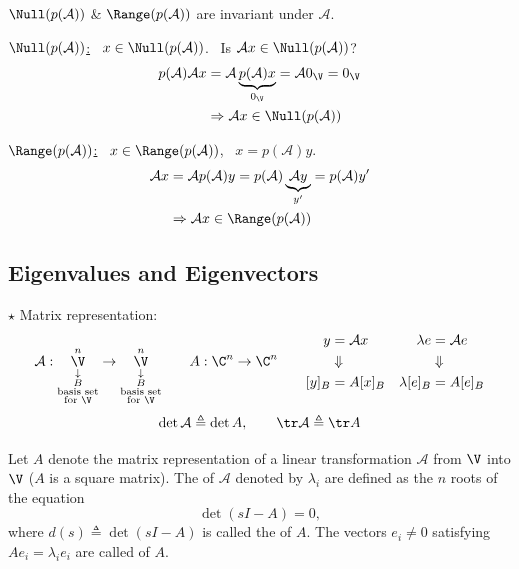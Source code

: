 \begin{example}
$\Null(p(\mathcal{A}))$ \& $\Range(p(\mathcal{A}))$ are invariant under $\mathcal{A}$.

\underline{$\Null(p(\mathcal{A}))$:} \ $x\in\Null(p(\mathcal{A}))$. \ Is $\mathcal{A}x\in\Null(p(\mathcal{A}))$?
\begin{align*}
p(\mathcal{A})\mathcal{A}x&=\mathcal{A}\underbrace{p(\mathcal{A})x}_{0_{\V}}=\mathcal{A}0_{\V}=0_{\V}\\
&\Rightarrow\mathcal{A}x\in\Null(p(\mathcal{A}))
\end{align*}

%
\underline{$\Range(p(\mathcal{A}))$:} \ $x\in\Range(p(\mathcal{A}))$, \ $x=p(\mathcal{A})y$.
\begin{align*}
\mathcal{A}x&=\mathcal{A}p(\mathcal{A})y=p(\mathcal{A})\underbrace{\mathcal{A}y}_{y'}=p(\mathcal{A})y'\\
&\Rightarrow\mathcal{A}x\in\Range(p(\mathcal{A}))
\end{align*}
\end{example}

\subsection{Eigenvalues and Eigenvectors}\label{ss:eigen}
$\star$ Matrix representation:
\[
\mathcal{A}:\underset{\substack{\downarrow\\ B\\ \text{basis set}\\ \text{for }\V}}{\overset{n}{\V}}\to\underset{\substack{\downarrow\\ B\\ \text{basis set}\\ \text{for }\V}}{\overset{n}{\V}}
\qquad A:\C^n\to\C^n
\qquad
\begin{aligned}
y&=\mathcal{A}x &\quad \lambda e&=\mathcal{A}e\\
&\Downarrow & &\Downarrow\\
[y]_B&=A[x]_B & \lambda[e]_B&=A[e]_B
\end{aligned}
\]
\[
\det\mathcal{A}\triangleq\det A,\qquad \tr\mathcal{A}\triangleq\tr A
\]

\begin{definition}
Let $A$ denote the matrix representation of a linear transformation $\mathcal{A}$ from $\V$ into $\V$ ($A$ is a square matrix). The  of $\mathcal{A}$ denoted by $\lambda_i$ are defined as the $n$ roots of the equation
\[
\det(sI-A)=0,
\]
where $d(s)\triangleq\det(sI-A)$ is called the  of $A$.
The vectors $e_i\neq0$ satisfying $Ae_i=\lambda_i e_i$ are called  of $A$.
\end{definition}

